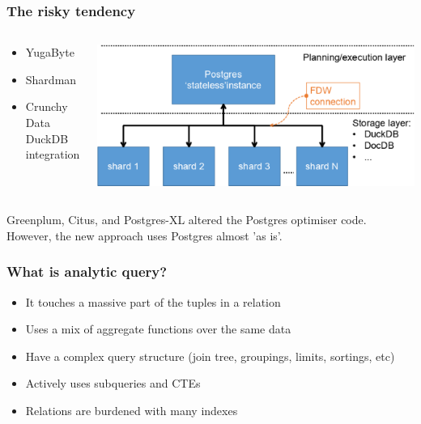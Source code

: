 \documentclass{beamer}
\begin{document}
\begin{frame}\frametitle{The risky tendency}
\begin{columns}\begin{column}{0.4\textwidth}
\begin{itemize}
  \item YugaByte
  \item Shardman
  \item Crunchy Data DuckDB integration
\end{itemize}
\end{column}
\begin{column}{0.6\textwidth}
  \includegraphics[scale=0.3]{pics/split_dbms}
\end{column}\end{columns}
\bigskip
Greenplum, Citus, and Postgres-XL altered the Postgres optimiser code. However, the new approach uses Postgres almost 'as is'.
\end{frame}

\begin{frame}\frametitle{What is analytic query?}
\begin{itemize}
  \item It touches a massive part of the tuples in a relation
  \item Uses a mix of aggregate functions over the same data
  \item Have a complex query structure (join tree, groupings, limits, sortings, etc)
  \item Actively uses subqueries and CTEs
  \item Relations are burdened with many indexes
\end{itemize}
\end{frame}
\end{document}
